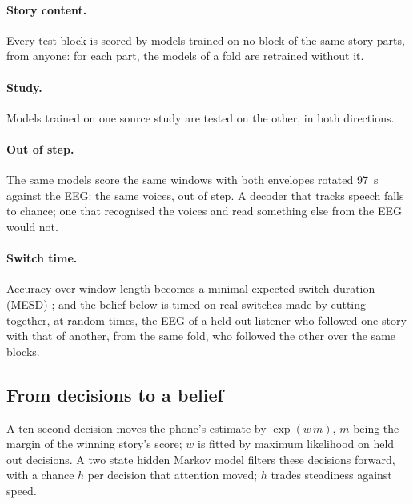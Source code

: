 \documentclass[11pt]{article}
\begin{document}
\paragraph{Story content.} Every test block is scored by models trained on no block of the same story parts, from anyone: for each part, the models of a fold are retrained without it.
\paragraph{Study.} Models trained on one source study are tested on the other, in both directions.
\paragraph{Out of step.} The same models score the same windows with both envelopes rotated 97~s against the EEG: the same voices, out of step. A decoder that tracks speech falls to chance; one that recognised the voices and read something else from the EEG would not.
\paragraph{Switch time.} Accuracy over window length becomes a minimal expected switch duration (MESD) \cite{geirnaert2019mesd}; and the belief below is timed on real switches made by cutting together, at random times, the EEG of a held out listener who followed one story with that of another, from the same fold, who followed the other over the same blocks.

\subsection{From decisions to a belief}
A ten second decision moves the phone's estimate by $\exp(w\,m)$, $m$ being the margin of the winning story's score; $w$ is fitted by maximum likelihood on held out decisions. A two state hidden Markov model filters these decisions forward, with a chance $h$ per decision that attention moved; $h$ trades steadiness against speed.
\end{document}
